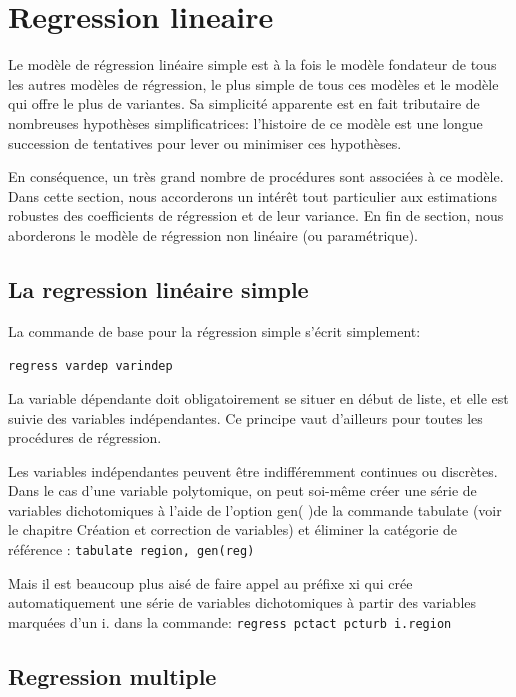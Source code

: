 \documentclass[
]{book}
\begin{document}
\hypertarget{regression-lineaire}{%
\section{Regression lineaire}\label{regression-lineaire}}

Le modèle de régression linéaire simple est à la fois le modèle
fondateur de tous les autres modèles de régression, le plus
simple de tous ces modèles et le modèle qui offre le plus de
variantes. Sa simplicité apparente est en fait tributaire de
nombreuses hypothèses simplificatrices: l'histoire de ce modèle
est une longue succession de tentatives pour lever ou minimiser
ces hypothèses.

En conséquence, un très grand nombre de procédures sont
associées à ce modèle. Dans cette section, nous accorderons un
intérêt tout particulier aux estimations robustes des coefficients
de régression et de leur variance. En fin de section, nous
aborderons le modèle de régression non linéaire (ou
paramétrique).

\hypertarget{la-regression-linuxe9aire-simple}{%
\subsection{La regression linéaire simple}\label{la-regression-linuxe9aire-simple}}

La commande de base pour la régression simple s'écrit
simplement:

\texttt{regress\ vardep\ varindep}

La variable dépendante doit obligatoirement se situer en début
de liste, et elle est suivie des variables indépendantes. Ce
principe vaut d'ailleurs pour toutes les procédures de régression.

Les variables indépendantes peuvent être indifféremment
continues ou discrètes. Dans le cas d'une variable polytomique,
on peut soi-même créer une série de variables dichotomiques à
l'aide de l'option gen( )de la commande tabulate (voir le
chapitre Création et correction de variables) et éliminer la
catégorie de référence :
\texttt{tabulate\ region,\ gen(reg)}

Mais il est beaucoup plus aisé de faire appel au préfixe xi qui
crée automatiquement une série de variables dichotomiques à
partir des variables marquées d'un i. dans la commande:
\texttt{regress\ pctact\ pcturb\ i.region}

\hypertarget{regression-multiple}{%
\subsection{Regression multiple}\label{regression-multiple}}
\end{document}

